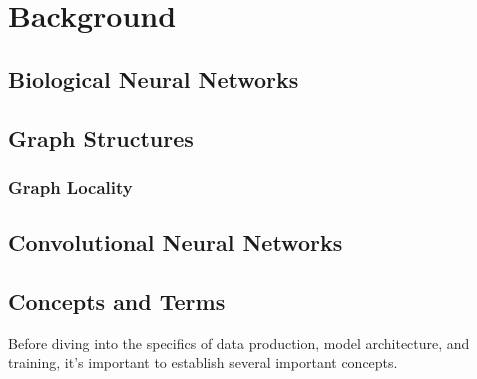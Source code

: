 
\chapter{Background}

\section{Biological Neural Networks}

\section{Graph Structures}

\subsection{Graph Locality}

\section{Convolutional Neural Networks}


\section{Concepts and Terms}
Before diving into the specifics of data production, model architecture, and 
training, it's important to establish several important concepts.


